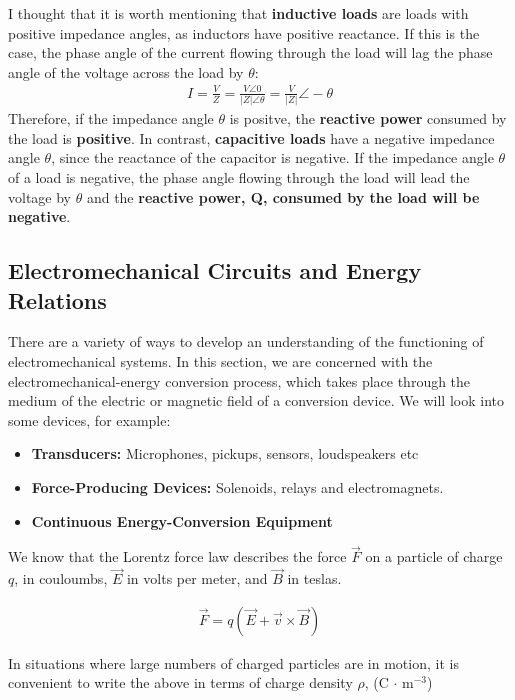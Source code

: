 \documentclass{book}
\begin{document}
I thought that it is worth mentioning that \textbf{inductive loads} are loads with positive impedance angles, as inductors have positive reactance. If this is the case, the phase angle of the current flowing through the load will lag the phase angle of the voltage across the load by $\theta$:
\begin{align*}
	I = \frac{V}{Z} = \frac{V\angle 0}{|Z| \angle \theta} = \frac{V}{|Z|} \angle -\theta
\end{align*} 
Therefore, if the impedance angle $\theta$ is positve, the \textbf{reactive power} consumed by the load is \textbf{positive}.
In contrast, \textbf{capacitive loads} have a negative impedance angle $\theta$, since the reactance of the capacitor is negative. If the impedance angle $\theta$ of a load is negative, the phase angle flowing through the load will lead the voltage by $\theta$ and the \textbf{reactive power, Q, consumed by the load will be negative}.

\subsection{Electromechanical Circuits and Energy Relations}

There are a variety of ways to develop an understanding of the functioning of electromechanical systems. In this section, we are concerned with the electromechanical-energy conversion process, which takes place through the medium of the electric or magnetic field of a conversion device.  We will look into some devices, for example:

\begin{itemize}
	\item \textbf{Transducers:} Microphones, pickups, sensors, loudspeakers etc
	\item \textbf{Force-Producing Devices:} Solenoids, relays and electromagnets. 
	\item \textbf{Continuous Energy-Conversion Equipment}
\end{itemize}

We know that the Lorentz force law describes the force $\vec{F}$ on a particle of charge $q$, in couloumbs, $\vec{E}$ in volts per meter, and $\vec{B}$ in teslas. 

\begin{align*}
	\vec{F} = q(\vec{E}+ \vec{v} \times \vec{B})
\end{align*}

In situations where large numbers of charged particles are in motion, it is convenient to write the above in terms of charge density $\rho$, (C $\cdot$ m$^{-3}$)
\end{document}
